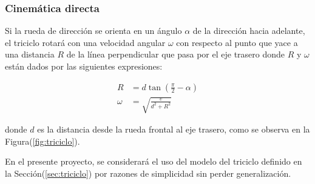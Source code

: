         \subsubsection{Cinemática directa}
        Si la rueda de dirección se orienta en un ángulo $\alpha$ de la dirección hacia adelante, el triciclo rotará con una 
        velocidad angular $\omega$ con respecto al punto que yace a una distancia $R$ de la línea perpendicular que pasa 
        por el eje trasero donde $R$ y $\omega$ están dados por las siguientes expresiones:

        \begin{align}
            R       &= d \tan(\frac{\pi}{2} - \alpha) \\
            \omega  &= \sqrt{\frac{v}{d^2 + R^2}}
        \end{align}

        donde $d$ es la distancia desde la rueda frontal al eje trasero, como se observa en la Figura(\ref{fig:triciclo}).

    
    En el presente proyecto, se considerará el uso del modelo del triciclo definido en la Sección(\ref{sec:triciclo}) 
    por razones de simplicidad sin perder generalización.
